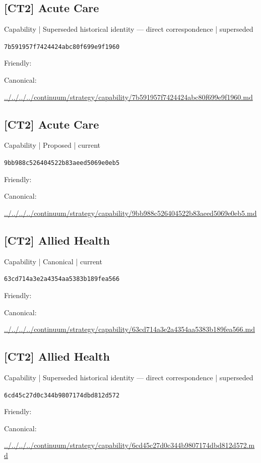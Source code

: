 \documentclass[10pt,a4paper]{article}
\begin{document}
\subsection*{[CT2] Acute Care}
{\small Capability | Superseded historical identity — direct correspondence | superseded}\par
\texttt{7b591957f7424424abc80f699e9f1960}\par
Friendly: \par
Canonical: \par
{\footnotesize\url{../../../../continuum/strategy/capability/7b591957f7424424abc80f699e9f1960.md}}\par
\subsection*{[CT2] Acute Care}
{\small Capability | Proposed | current}\par
\texttt{9bb988c526404522b83aeed5069e0eb5}\par
Friendly: \par
Canonical: \par
{\footnotesize\url{../../../../continuum/strategy/capability/9bb988c526404522b83aeed5069e0eb5.md}}\par
\subsection*{[CT2] Allied Health}
{\small Capability | Canonical | current}\par
\texttt{63cd714a3e2a4354aa5383b189fea566}\par
Friendly: \par
Canonical: \par
{\footnotesize\url{../../../../continuum/strategy/capability/63cd714a3e2a4354aa5383b189fea566.md}}\par
\subsection*{[CT2] Allied Health}
{\small Capability | Superseded historical identity — direct correspondence | superseded}\par
\texttt{6cd45c27d0c344b9807174dbd812d572}\par
Friendly: \par
Canonical: \par
{\footnotesize\url{../../../../continuum/strategy/capability/6cd45c27d0c344b9807174dbd812d572.md}}\par
\end{document}
